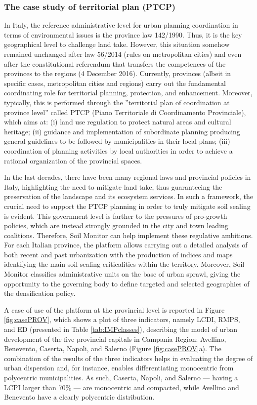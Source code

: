 \documentclass[APA,LATO1COL,doublespace]{WileyNJD-v2}
\begin{document}
\subsubsection{The case study of territorial plan (PTCP)}
In Italy, the reference administrative level for urban planning coordination in terms of environmental issues is the province law 142/1990. 
Thus, it is the key geographical level to challenge land take. 
However, this situation somehow remained unchanged after law 56/2014 (rules on metropolitan cities) and even after the constitutional referendum that transfers the competences of the provinces to the regions (4 December 2016).
Currently, provinces (albeit in specific cases, metropolitan cities and regions) carry out the fundamental coordinating role for territorial planning, protection, and enhancement. 
Moreover, typically, this is performed through the ''territorial plan of coordination at province level'' called PTCP (Piano Territoriale di Coordinamento Provinciale), which aims at: (i) land use regulation to protect natural areas and cultural heritage; (ii) guidance and implementation of subordinate planning producing general guidelines to be followed by municipalities in their local plans; (iii) coordination of planning activities by local authorities in order to achieve a rational organization of the provincial spaces.

In the last decades, there have been many regional laws and provincial policies in Italy, highlighting the need to mitigate land take, thus guaranteeing the preservation of the landscape and its ecosystem services. 
In such a framework, the crucial need to support the PTCP planning in order to truly mitigate soil sealing is evident. 
This government level is farther to the pressures  of pro-growth policies, which are instead strongly grounded in the city and town leading coalitions.
Therefore, Soil Monitor can help implement these regulative ambitions.
For each Italian province, the platform allows carrying out a detailed analysis of both recent and past urbanization with the production of indices and maps identifying the main soil sealing criticalities within the territory.
Moreover, Soil Monitor classifies administrative units on the base of urban sprawl, giving the opportunity to the governing body to define targeted and selected geographies of the densification policy.

A case of use of the platform at the provincial level is reported in Figure \ref{fig:casePROV}, which shows a plot of three indicators, namely LCDI, RMPS, and ED (presented in Table \ref{tab:IMPclasses}), describing the model of urban development of the five provincial capitals in Campania Region: Avellino, Benevento, Caserta, Napoli, and Salerno (Figure \ref{fig:casePROV}a). 
The combination of the results of the three indicators helps in evaluating the degree of urban dispersion and, for instance, enables differentiating monocentric from polycentric municipalities. 
As such, Caserta, Napoli, and Salerno --- having a LCPI larger than 70\% --- are monocentric and compacted, while Avellino and Benevento have a clearly polycentric distribution.
\end{document}
